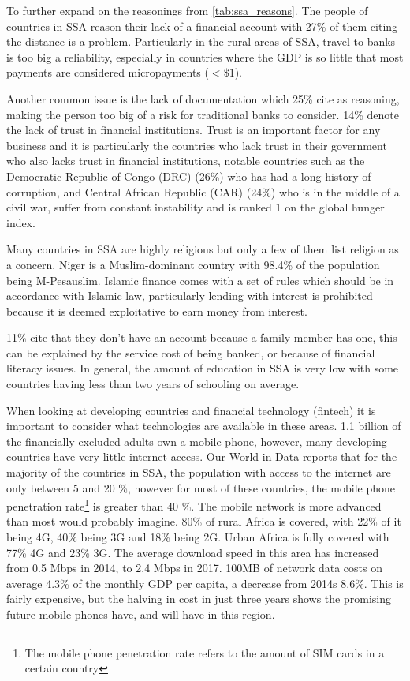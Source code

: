 \documentclass[11pt, a4paper]{article}
\begin{document}
To further expand on the reasonings from \autoref{tab:ssa_reasons}. The people of countries in SSA reason their lack of a financial account with 27\% of them citing the distance is a problem. Particularly in the rural areas of SSA, travel to banks is too big a reliability, especially in countries where the GDP is so little that most payments are considered micropayments ($< \$1$).

Another common issue is the lack of documentation which 25\% cite as reasoning, making the person too big of a risk for traditional banks to consider. 14\% denote the lack of trust in financial institutions. Trust is an important factor for any business and it is particularly the countries who lack trust in their government who also lacks trust in financial institutions, notable countries such as the Democratic Republic of Congo (DRC) (26\%)\cite{gfindex} who has had a long history of corruption, and Central African Republic (CAR) (24\%)\cite{gfindex} who is in the middle of a civil war, suffer from constant instability and is ranked 1 on the global hunger index\cite{ghi}.

Many countries in SSA are highly religious but only a few of them list religion as a concern. Niger is a Muslim-dominant country with 98.4\% of the population being M-Pesauslim\cite{muslim}. Islamic finance comes with a set of rules which should be in accordance with Islamic law, particularly lending with interest is prohibited because it is deemed exploitative to earn money from interest\cite{islam_invest}.

11\% cite that they don't have an account because a family member has one, this can be explained by the service cost of being banked, or because of financial literacy issues. In general, the amount of education in SSA is very low with some countries having less than two years of schooling on average\cite{hdr}.



When looking at developing countries and financial technology (fintech) it is important to consider what technologies are available in these areas. 1.1 billion of the financially excluded adults own a mobile phone\cite{gfindex}, however, many developing countries have very little internet access. Our World in Data reports that for the majority of the countries in SSA, the population with access to the internet are only between 5 and 20 \%\cite{owidinternet}, however for most of these countries, the mobile phone penetration rate\footnote{The mobile phone penetration rate refers to the amount of SIM cards in a certain country} is greater than 40 \%\cite{owidinternet}. The mobile network is more advanced than most would probably imagine. 80\% of rural Africa is covered, with 22\% of it being 4G, 40\% being 3G and 18\% being 2G. Urban Africa is fully covered with 77\% 4G and 23\% 3G\cite{ituinternet}. The average download speed in this area has increased from 0.5 Mbps in 2014, to 2.4 Mbps in 2017\cite{gsma}. 100MB of network data costs on average 4.3\% of the monthly GDP per capita, a decrease from 2014s 8.6\%. This is fairly expensive, but the halving in cost in just three years shows the promising future mobile phones have, and will have in this region.
\end{document}

